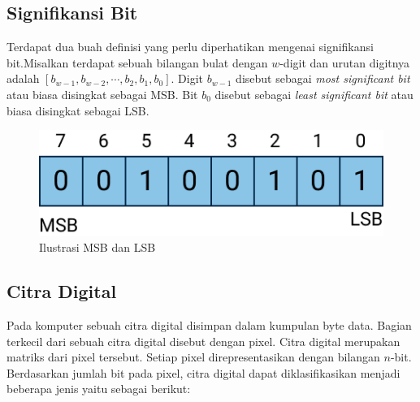 \documentclass[10pt,conference]{IEEEtran}
\theoremstyle{definition}
\begin{document}
\subsection{Signifikansi Bit}
Terdapat dua buah definisi yang perlu diperhatikan mengenai signifikansi bit.Misalkan terdapat sebuah bilangan bulat dengan $ w $-digit dan urutan 
digitnya adalah $ [b_{w-1}, b_{w-2}, \cdots, b_{2}, b_{1}, b_{0}] $. Digit $ b_{w-1} $ disebut sebagai \emph{most significant bit} atau biasa disingkat 
sebagai MSB. Bit $ b_{0} $ disebut sebagai \emph{least significant bit} atau biasa disingkat sebagai LSB.

\begin{figure}[htbp]
    \centerline{\includegraphics[width=0.9\columnwidth]{MSB-LSB.png}}
    \caption{Ilustrasi MSB dan LSB}
\end{figure}

\subsection{Citra Digital}
Pada komputer sebuah citra digital disimpan dalam kumpulan byte data. Bagian terkecil dari sebuah citra digital disebut dengan pixel. Citra digital
merupakan matriks dari pixel tersebut. Setiap pixel direpresentasikan dengan bilangan $n$-bit. Berdasarkan jumlah bit pada pixel, citra digital dapat 
diklasifikasikan menjadi beberapa jenis yaitu sebagai berikut: \cite{b1}\cite{b3}
\end{document}
